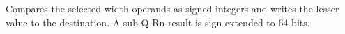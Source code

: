 Compares the selected-width operands as signed integers and writes the lesser value to the destination. A sub-Q Rn result is sign-extended to 64 bits.
